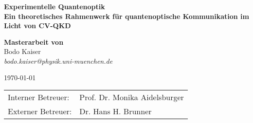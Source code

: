 \makeatletter
\begin{titlepage}
    \begin{otherlanguage}{ngerman}
		\begin{center}
			\large
			    \textbf{\textsf{Experimentelle Quantenoptik}}\\
		    \vspace{0.8em}
			\huge
		    \textbf{\textsf{Ein theoretisches Rahmenwerk für quantenoptische Kommunikation im Licht von CV-QKD}}\\
			
			\vspace{1.2em}
			\begin{figure}[htb]
				\centering
			    
			\end{figure}
			
			\vspace{.6em}
		    \large
		    \textbf{Masterarbeit von}\\
			\vspace{.8em}
		    \large
			Bodo Kaiser\\
		    \vspace{.2em}
			\textit{bodo.kaiser@physik.uni-muenchen.de}
	
		    \large
		    \today
	
		    \vspace{1.9em}
			\normalsize
			\begin{tabular}{ll}
			Interner Betreuer: & Prof. Dr. Monika Aidelsburger \\
			Externer Betreuer: & Dr. Hans H. Brunner \\
			\end{tabular}
		\end{center}
    \end{otherlanguage}
\end{titlepage}
\makeatother